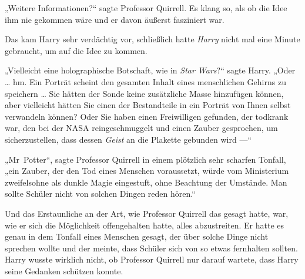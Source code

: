 „Weitere Informationen?“ sagte Professor Quirrell. Es klang so, als ob die Idee ihm nie gekommen wäre und er davon äußerst fasziniert war.

Das kam Harry sehr verdächtig vor, schließlich hatte \emph{Harry} nicht mal eine Minute gebraucht, um auf die Idee zu kommen.

„Vielleicht eine holographische Botschaft, wie in \emph{Star Wars}?“ sagte Harry.
„Oder … hm. Ein Porträt scheint den gesamten Inhalt eines menschlichen Gehirns zu speichern … Sie hätten der Sonde keine zusätzliche Masse hinzufügen können, aber vielleicht hätten Sie einen der Bestandteile in ein Porträt von Ihnen selbst verwandeln können? Oder Sie haben einen Freiwilligen gefunden, der todkrank war, den bei der NASA reingeschmuggelt und einen Zauber gesprochen, um sicherzustellen, dass dessen \emph{Geist} an die Plakette gebunden wird —“

„Mr~Potter“, sagte Professor Quirrell in einem plötzlich sehr scharfen Tonfall, „ein Zauber, der den Tod eines Menschen voraussetzt, würde vom Ministerium zweifelsohne als dunkle Magie eingestuft, ohne Beachtung der Umstände. Man sollte Schüler nicht von solchen Dingen reden hören.“

Und das Erstaunliche an der Art, wie Professor Quirrell das gesagt hatte, war, wie er sich die Möglichkeit offengehalten hatte, alles abzustreiten. Er hatte es genau in dem Tonfall eines Menschen gesagt, der über solche Dinge nicht sprechen wollte und der meinte, dass Schüler sich von so etwas fernhalten sollten. Harry wusste wirklich nicht, ob Professor Quirrell nur darauf wartete, dass Harry seine Gedanken schützen konnte.

